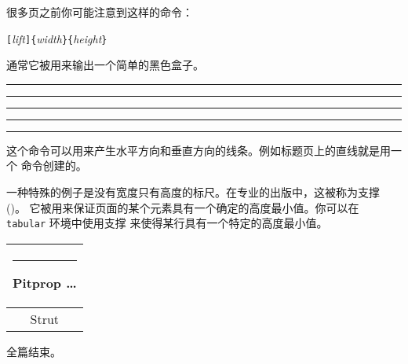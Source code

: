 很多页之前你可能注意到这样的命令：
\begin{lscommand}
\verb|[|\emph{lift}\verb|]{|\emph{width}\verb|}{|\emph{height}\verb|}|
\end{lscommand}

\noindent 通常它被用来输出一个简单的黑色盒子。

\begin{example}
\rule{3mm}{.1pt}%
\rule[-1mm]{5mm}{1cm}%
\rule{3mm}{.1pt}%
\rule[1mm]{1cm}{5mm}%
\rule{3mm}{.1pt}
\end{example}

\noindent 这个命令可以用来产生水平方向和垂直方向的线条。例如标题页上的直线就是用一个  命令创建的。

一种特殊的例子是没有宽度只有高度的标尺。在专业的出版中，这被称为支撑 ()。
它被用来保证页面的某个元素具有一个确定的高度最小值。你可以在 \texttt{tabular} 环境中使用支撑
来使得某行具有一个特定的高度最小值。

\begin{example}
\begin{tabular}{|c|}
\hline
\rule{1pt}{4ex}Pitprop \ldots\\
\hline
\rule{0pt}{4ex}Strut\\
\hline
\end{tabular}
\end{example}

\bigskip
{\flushright 全篇结束。\par}
%

